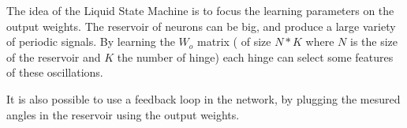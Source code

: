 The idea of the Liquid State Machine is to focus the learning parameters on the output weights. The reservoir of neurons can be big, and produce a large variety of periodic signals. By learning the $W_o$ matrix ( of size $N * K$ where $N$ is the size of the reservoir and $K$ the number of hinge) each hinge can select some features of these oscillations. 

It is also possible to use a feedback loop in the network, by plugging the mesured angles in the reservoir using the output weights. 

 



